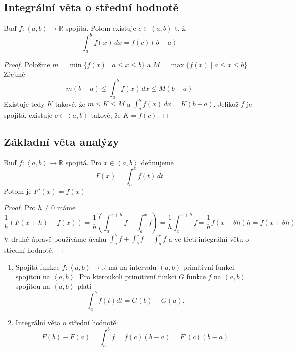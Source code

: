 \documentclass[../main.tex]{subfiles}
\begin{document}
\subsection{Integrální věta o střední hodnotě}
\begin{theorem}
	Buď $f: \left< a,b \right> \to \mathbb{R}$ spojitá. Potom existuje $c \in \left< a,b \right>$ t. ž.
	\[ \int_{a}^{b} f(x) \,dx = f(c)(b-a)\]
\end{theorem}

\begin{proof}
	Položme $m = \min \{ f(x) \mid a \leq x \leq b \}$ a $M = \max \{ f(x) \mid a \leq x \leq b \} $
	Zřejmě
	\[ m(b-a) \leq \int_{a}^{b} f(x) \,dx \leq M(b-a) \]
	Existuje tedy $K$ takové, že $m \leq K \leq M$ a $\int_{a}^{b} f(x) \,dx = K(b-a)$.
	Jelikož $f$ je spojitá, existuje $c \in \left< a,b \right>$ takové, že $K = f(c)$.
\end{proof}

\subsection{Základní věta analýzy}
\begin{theorem}
	Buď $f: \left< a,b \right> \to \mathbb{R}$ spojitá. Pro $x \in \left< a,b \right>$ definujeme
	\[ F(x) = \int_{a}^{x} f(t) \,dt \]
	Potom je $F'(x) = f(x)$
\end{theorem}

\begin{proof}
	Pro $h\neq 0$ máme
	\[ \frac{1}{h}(F(x+h) - f(x)) =\frac{1}{h}\left( \int_{a}^{x+h} f - \int_{a}^{x} f \right) =
	\frac{1}{h} \int_{x}^{x+h} f = \frac{1}{h}f(x + \theta h)h = f(x + \theta h) \]
	V druhé úpravě používáme úvahu $\int_a^b f+ \int_b^c f = \int_a^c f$ a ve třetí integrální větu o střední hodnotě.
\end{proof}

\begin{consequence}
	\hfill
	\begin{enumerate}
	    \item Spojitá funkce $f : \left<a,b\right> \rightarrow \mathbb{R}$ má na intervalu $(a,b)$ primitivní funkci spojitou na $\left<a,b\right>$.
	          Pro kteroukoli primitivní funkci $G$ funkce $f$ na $(a,b)$ spojitou na $\left<a,b\right>$ platí
	          \[\int^b_a f(t)dt = G(b) - G(a).\]
	    \item Integrální věta o střední hodnotě:
	    \[F(b) - F(a) = \int^b_a f = f(c)(b-a) = F'(c)(b-a)\]
	\end{enumerate}
\end{consequence}
\end{document}
